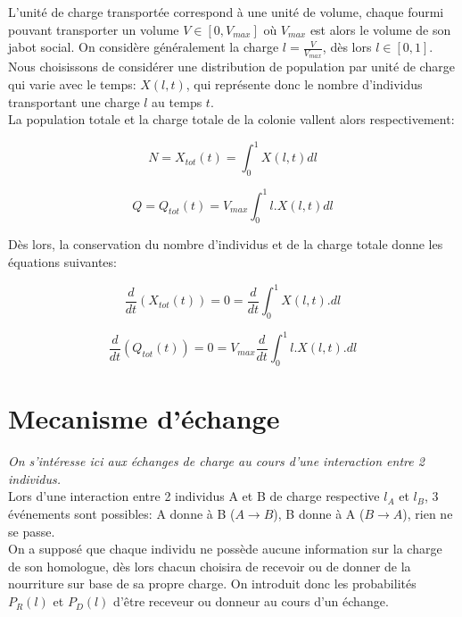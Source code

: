 L'unité de charge transportée correspond à une unité de volume, chaque fourmi pouvant transporter un volume $V\in[0,V_{max}]$ où $V_{max}$ est alors le volume de son jabot social. On considère généralement la charge $l=\frac{V}{V_{max}}$, dès lors $l\in[0,1]$.\\

Nous choisissons de considérer une distribution de population par unité de charge qui varie avec le temps: $X(l,t)$, qui représente donc le nombre d'individus transportant une charge $l$ au temps $t$.\\

La population totale et la charge totale de la colonie vallent alors respectivement:

\begin{equation}
N = X_{tot}(t) = \int^1_0X(l,t) dl
\label{Xtot}
\end{equation}

\begin{equation}
Q = Q_{tot}(t) = V_{max} \int^1_0 l.X(l,t) dl
\label{Qtot}
\end{equation}


Dès lors, la conservation du nombre d'individus et de la charge totale donne les équations suivantes:

\begin{equation}
\frac{d}{d t} (X_{tot}(t)) = 0 = \frac{d}{dt}\int^1_0 X(l,t).dl
\label{ConservationXtot}
\end{equation}

\begin{equation}
\frac{d}{d t} (Q_{tot}(t)) = 0 = V_{max} \frac{d}{dt}\int^1_0 l.X(l,t).dl
\label{ConservationQtot}
\end{equation}

\section{Mecanisme d'échange}

\textit{On s'intéresse ici aux échanges de charge au cours d'une interaction entre 2 individus.}\\

Lors d'une interaction entre 2 individus A et B de charge respective $l_A$ et $l_B$, 3 événements sont possibles: A donne à B ($A \rightarrow B$), B donne à A ($B \rightarrow A$), rien ne se passe.\\

On a supposé que chaque individu ne possède aucune information sur la charge de son homologue, dès lors chacun choisira de recevoir ou de donner de la nourriture sur base de sa propre charge. On introduit donc les probabilités $P_R(l)$ et $P_D(l)$ d'être receveur ou donneur au cours d'un échange.\\


